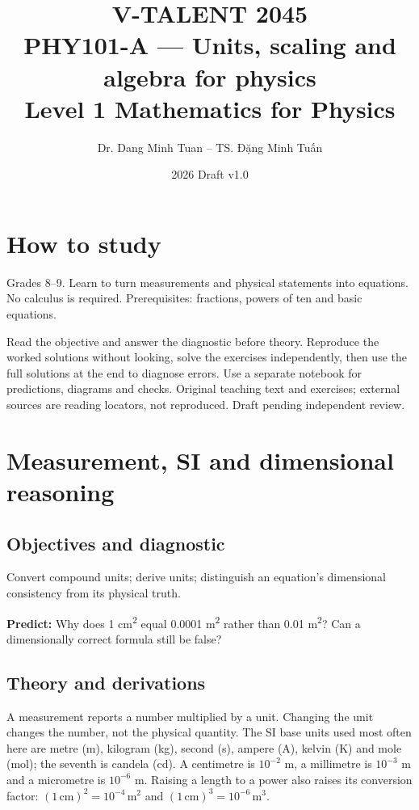 \documentclass[11pt,a4paper,openany]{book}
\begin{document}
\title{V-TALENT 2045\\ PHY101-A --- Units, scaling and algebra for physics\\\large Level 1 \textbar{} Mathematics for Physics}
\author{Dr. Dang Minh Tuan -- TS. Đặng Minh Tuấn}
\date{2026 \textbar{} Draft v1.0}
\maketitle
\tableofcontents
\chapter*{How to study}
Grades 8–9. Learn to turn measurements and physical statements into equations. No calculus is required. Prerequisites: fractions, powers of ten and basic equations.

Read the objective and answer the diagnostic before theory. Reproduce the worked solutions without looking, solve the exercises independently, then use the full solutions at the end to diagnose errors. Use a separate notebook for predictions, diagrams and checks. Original teaching text and exercises; external sources are reading locators, not reproduced. Draft pending independent review.
\chapter{Measurement, SI and dimensional reasoning}
\section{Objectives and diagnostic}
Convert compound units; derive units; distinguish an equation's dimensional consistency from its physical truth.

\textbf{Predict:} Why does 1 cm\textsuperscript{2} equal 0.0001 m\textsuperscript{2} rather than 0.01 m\textsuperscript{2}? Can a dimensionally correct formula still be false?
\section{Theory and derivations}
A measurement reports a number multiplied by a unit. Changing the unit changes the number, not the physical quantity. The SI base units used most often here are metre (m), kilogram (kg), second (s), ampere (A), kelvin (K) and mole (mol); the seventh is candela (cd). A centimetre is $10^{-2}$ m, a millimetre is $10^{-3}$ m and a micrometre is $10^{-6}$ m. Raising a length to a power also raises its conversion factor: $(1\,\mathrm{cm})^2=10^{-4}\,\mathrm{m^2}$ and $(1\,\mathrm{cm})^3=10^{-6}\,\mathrm{m^3}$.
\end{document}
